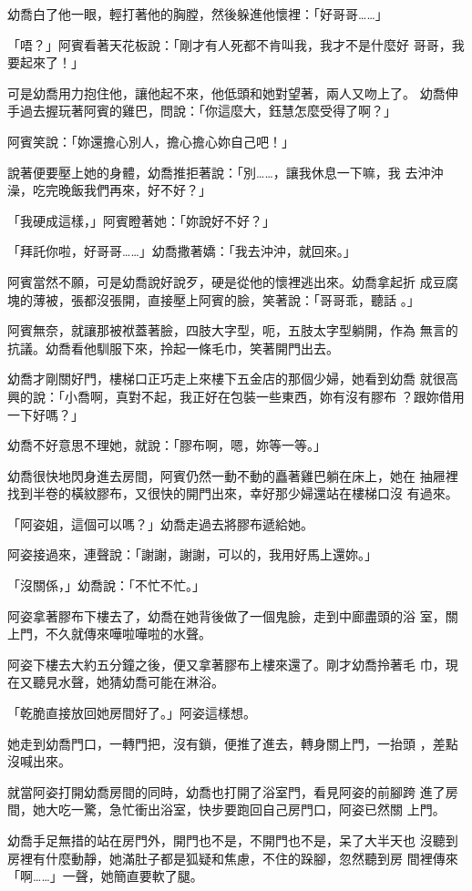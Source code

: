 幼喬白了他一眼，輕打著他的胸膛，然後躲進他懷裡：「好哥哥……」

「唔？」阿賓看著天花板說：「剛才有人死都不肯叫我，我才不是什麼好
哥哥，我要起來了！」

可是幼喬用力抱住他，讓他起不來，他低頭和她對望著，兩人又吻上了。
幼喬伸手過去握玩著阿賓的雞巴，問說：「你這麼大，鈺慧怎麼受得了啊？」

阿賓笑說：「妳還擔心別人，擔心擔心妳自己吧！」

說著便要壓上她的身體，幼喬推拒著說：「別……，讓我休息一下嘛，我
去沖沖澡，吃完晚飯我們再來，好不好？」

「我硬成這樣，」阿賓瞪著她：「妳說好不好？」

「拜託你啦，好哥哥……」幼喬撒著嬌：「我去沖沖，就回來。」

阿賓當然不願，可是幼喬說好說歹，硬是從他的懷裡逃出來。幼喬拿起折
成豆腐塊的薄被，張都沒張開，直接壓上阿賓的臉，笑著說：「哥哥乖，聽話
。」

阿賓無奈，就讓那被袱蓋著臉，四肢大字型，呃，五肢太字型躺開，作為
無言的抗議。幼喬看他馴服下來，拎起一條毛巾，笑著開門出去。

幼喬才剛關好門，樓梯口正巧走上來樓下五金店的那個少婦，她看到幼喬
就很高興的說：「小喬啊，真對不起，我正好在包裝一些東西，妳有沒有膠布
？跟妳借用一下好嗎？」

幼喬不好意思不理她，就說：「膠布啊，嗯，妳等一等。」

幼喬很快地閃身進去房間，阿賓仍然一動不動的矗著雞巴躺在床上，她在
抽屜裡找到半卷的橫紋膠布，又很快的開門出來，幸好那少婦還站在樓梯口沒
有過來。

「阿姿姐，這個可以嗎？」幼喬走過去將膠布遞給她。

阿姿接過來，連聲說：「謝謝，謝謝，可以的，我用好馬上還妳。」

「沒關係，」幼喬說：「不忙不忙。」

阿姿拿著膠布下樓去了，幼喬在她背後做了一個鬼臉，走到中廊盡頭的浴
室，關上門，不久就傳來嘩啦嘩啦的水聲。

阿姿下樓去大約五分鐘之後，便又拿著膠布上樓來還了。剛才幼喬拎著毛
巾，現在又聽見水聲，她猜幼喬可能在淋浴。

「乾脆直接放回她房間好了。」阿姿這樣想。

她走到幼喬門口，一轉門把，沒有鎖，便推了進去，轉身關上門，一抬頭
，差點沒喊出來。

就當阿姿打開幼喬房間的同時，幼喬也打開了浴室門，看見阿姿的前腳跨
進了房間，她大吃一驚，急忙衝出浴室，快步要跑回自己房門口，阿姿已然關
上門。

幼喬手足無措的站在房門外，開門也不是，不開門也不是，呆了大半天也
沒聽到房裡有什麼動靜，她滿肚子都是狐疑和焦慮，不住的跺腳，忽然聽到房
間裡傳來「啊……」一聲，她簡直要軟了腿。

